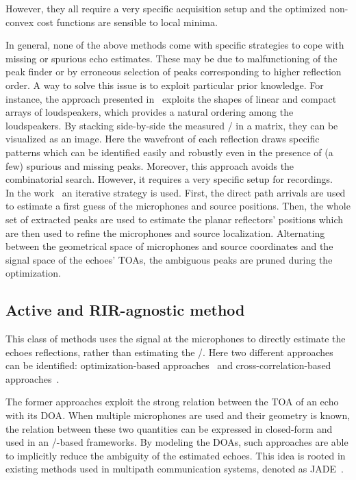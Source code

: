 However, they all require a very specific acquisition setup and the optimized non-convex cost functions are sensible to local minima.

\mynewline
In general, none of the above methods come with specific strategies to cope with missing or spurious echo estimates.
These may be due to malfunctioning of the peak finder or by erroneous selection of peaks corresponding to higher reflection order.
A way to solve this issue is to exploit particular prior knowledge.
For instance, the approach presented in~ exploits the shapes of linear and compact arrays of loudspeakers, which provides a natural ordering among the loudspeakers.
By stacking side-by-side the measured \RIRs/ in a matrix, they can be visualized as an image.
Here the wavefront of each reflection draws specific patterns which can be identified easily and robustly even in the presence of (a few) spurious and missing peaks.
Moreover, this approach avoids the combinatorial search.
However, it requires a very specific setup for recordings.
\\In the work~ an iterative strategy is used.
First, the direct path arrivals are used to estimate a first guess of the microphones and source positions.
Then, the whole set of extracted peaks are used to estimate the planar reflectors' positions which are then used to refine the microphones and source localization.
Alternating between the geometrical space of microphones and source coordinates and the signal space of the echoes' \acp{TOA}, the ambiguous peaks are pruned during the optimization.

\subsection{Active and RIR-agnostic method}\label{subsec:estimation:active_agnostic}
This class of methods uses the signal at the microphones to directly estimate the echoes reflections, rather than estimating the \RIRs/.
Here two different approaches can be identified: optimization-based approaches~ and cross-correlation-based approaches~.

\mynewline
The former approaches exploit the strong relation between the \ac{TOA} of an echo with its \ac{DOA}.
When multiple microphones are used and their geometry is known, the relation between these two quantities can be expressed in closed-form and used in an \ML/-based frameworks.
By modeling the \ac{DOA}s, such approaches are able to implicitly reduce the ambiguity of the estimated echoes.
This idea is rooted in existing methods used in multipath communication systems, denoted as \ac{JADE}~.

